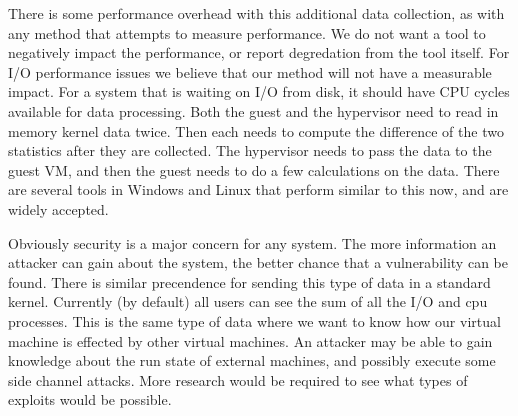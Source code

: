 There is some performance overhead with this additional data collection, as with any method that attempts to measure performance.  We do not want a tool to negatively impact the performance, or report degredation from the tool itself.  For I/O performance issues we believe that our method will not have a measurable impact.  For a system that is waiting on I/O from disk, it should have CPU cycles available for data processing.   Both the guest and the hypervisor need to read in memory kernel data twice.  Then each needs to compute the difference of the two statistics after they are collected.  The hypervisor needs to pass the data to the guest VM, and then the guest needs to do a few calculations on the data.  There are several tools in Windows and Linux that perform similar to this now, and are widely accepted.

Obviously security is a major concern for any system.  The more information an attacker can gain about the system, the better chance that a vulnerability can be found.  There is similar precendence for sending this type of data in a standard kernel.  Currently (by default) all users can see the sum of all the I/O and cpu processes.  This is the same type of data where we want to know how our virtual machine is effected by other virtual machines.  An attacker may be able to gain knowledge about the run state of external machines, and possibly execute some side channel attacks.  More research would be required to see what types of exploits would be possible.  


